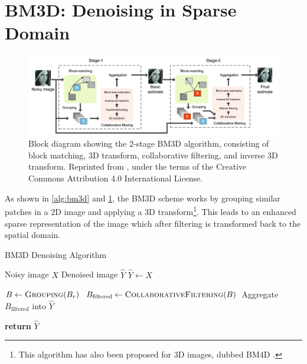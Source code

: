 \section{BM3D: Denoising in Sparse Domain}

\begin{figure}
    \centering
    \includegraphics[width=1\linewidth]{images/bm3d_schematic.png}
    \caption{Block diagram showing the 2-stage \gls{BM3D} algorithm, consisting of block matching, 3D transform, collaborative filtering, and inverse 3D transform. Reprinted from \cite{wangFPGABasedHardwareAccelerator2020}, under the terms of the Creative Commons Attribution 4.0 International License.}
    \label{fig:bm3d-schematic}
\end{figure}


As shown in \cref{alg:bm3d} and \cref{fig:bm3d-schematic}, the \gls{BM3D} scheme works by grouping similar patches in a 2D image and applying a 3D transform\footnote{This algorithm has also been proposed for 3D images, dubbed BM4D \cite{mNonlocalTransformdomainFilter}.}. This leads to an enhanced sparse representation of the image which after filtering is transformed back to the spatial domain.
\begin{algorithm}
    \caption{BM3D Denoising Algorithm}\label{alg:bm3d}
    \begin{algorithmic}[1]
    \Require Noisy image $X$
    \Ensure Denoised image $\hat{Y}$
    \Statex
        \State $\hat{Y} \gets X$
        
            \State $B \gets \textsc{Grouping}(B_r)$
            \State $B_{\text{filtered}} \gets \textsc{CollaborativeFiltering}(B)$
            \State Aggregate $B_{\text{filtered}}$ into $\hat{Y}$
        \EndFor
        
        \State \textbf{return} $\hat{Y}$
    \EndProcedure
    \end{algorithmic}
\end{algorithm}

